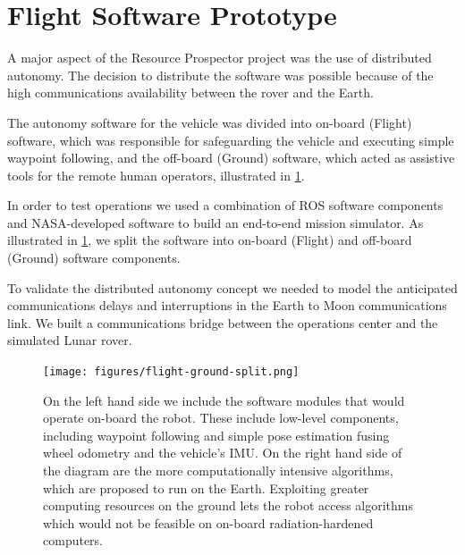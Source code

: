 \documentclass[twocolumn,letterpaper]{IEEEAerospaceCLS}  %
\begin{document}
\section{Flight Software Prototype}
\label{sec:flight-software}

A major aspect of the Resource Prospector project was the use of distributed autonomy.  The decision to distribute the software was possible because of the high communications availability between the rover and the Earth. 

The autonomy software for the vehicle was divided into on-board (Flight) software, which was responsible for safeguarding the vehicle and executing simple waypoint following, and the off-board (Ground) software, which acted as assistive tools for the remote human operators, illustrated in \cref{fig:rp-software}.  

In order to test operations we used a combination of ROS software components and NASA-developed software to build an end-to-end mission simulator.  As illustrated in \cref{fig:rp-software}, we split the software into on-board (Flight) and off-board (Ground) software components.  

To validate the distributed autonomy concept we needed to model the anticipated communications delays and interruptions in the Earth to Moon communications link.  We built a communications bridge between the operations center and the simulated Lunar rover.

\begin{figure}
\centering
\texttt{[image: figures/flight-ground-split.png]}
\caption{On the left hand side we include the software modules that would operate on-board the robot.  These include low-level components, including waypoint following and simple pose estimation fusing wheel odometry and the vehicle's IMU.  
On the right hand side of the diagram are the more computationally intensive algorithms, which are proposed to run on the Earth.  Exploiting greater computing resources on the ground lets the robot access algorithms which would not be feasible on on-board radiation-hardened computers.  \label{fig:rp-software}}
\end{figure}
\end{document}
